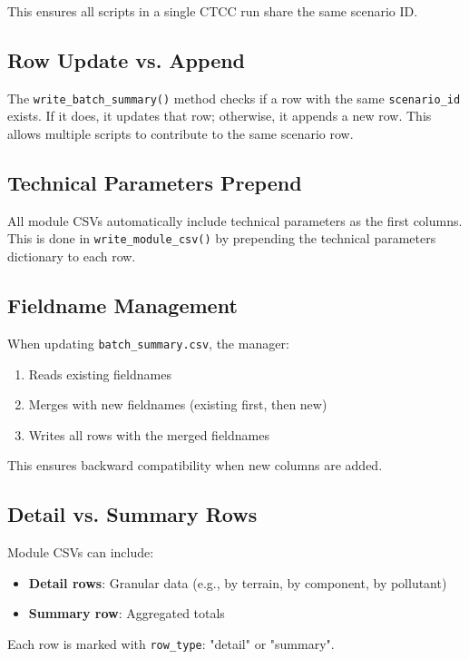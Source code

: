 \documentclass[ctcc_full_documentation.tex]{subfiles}
\begin{document}
This ensures all scripts in a single CTCC run share the same scenario ID.

\subsection{Row Update vs. Append}

The \texttt{write\_batch\_summary()} method checks if a row with the same \texttt{scenario\_id} exists. If it does, it updates that row; otherwise, it appends a new row. This allows multiple scripts to contribute to the same scenario row.

\subsection{Technical Parameters Prepend}

All module CSVs automatically include technical parameters as the first columns. This is done in \texttt{write\_module\_csv()} by prepending the technical parameters dictionary to each row.

\subsection{Fieldname Management}

When updating \texttt{batch\_summary.csv}, the manager:
\begin{enumerate}
    \item Reads existing fieldnames
    \item Merges with new fieldnames (existing first, then new)
    \item Writes all rows with the merged fieldnames
\end{enumerate}

This ensures backward compatibility when new columns are added.

\subsection{Detail vs. Summary Rows}

Module CSVs can include:
\begin{itemize}
    \item \textbf{Detail rows}: Granular data (e.g., by terrain, by component, by pollutant)
    \item \textbf{Summary row}: Aggregated totals
\end{itemize}

Each row is marked with \texttt{row\_type}: "detail" or "summary".
\end{document}
